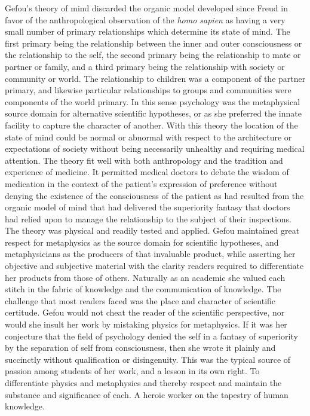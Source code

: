 Gefou's theory of mind discarded the organic model developed since
Freud in favor of the anthropological observation of the {\it homo
sapien} as having a very small number of primary relationships which
determine its state of mind.  The first primary being the relationship
between the inner and outer consciousness or the relationship to the
self, the second primary being the relationship to mate or partner or
family, and a third primary being the relationship with society or
community or world.  The relationship to children was a component of
the partner primary, and likewise particular relationships to groups
and communities were components of the world primary.  In this sense
psychology was the metaphysical source domain for alternative
scientific hypotheses, or as she preferred the innate facility to
capture the character of another.  With this theory the location of
the state of mind could be normal or abnormal with respect to the
architecture or expectations of society without being necessarily
unhealthy and requiring medical attention.  The theory fit well with
both anthropology and the tradition and experience of medicine.  It
permitted medical doctors to debate the wisdom of medication in the
context of the patient's expression of preference without denying the
existence of the consciousness of the patient as had resulted from the
organic model of mind that had delivered the superiority fantasy that
doctors had relied upon to manage the relationship to the subject of
their inspections.  The theory was physical and readily tested and
applied.  Gefou maintained great respect for metaphysics as the source
domain for scientific hypotheses, and metaphysicians as the producers
of that invaluable product, while asserting her objective and
subjective material with the clarity readers required to differentiate
her products from those of others.  Naturally as an academic she
valued each stitch in the fabric of knowledge and the communication of
knowledge.  The challenge that most readers faced was the place and
character of scientific certitude.  Gefou would not cheat the reader
of the scientific perspective, nor would she insult her work by
mistaking physics for metaphysics.  If it was her conjecture that the
field of psychology denied the self in a fantasy of superiority by the
separation of self from consciousness, then she wrote it plainly and
succinctly without qualification or disingenuity.  This was the
typical source of passion among students of her work, and a lesson in
its own right.  To differentiate physics and metaphysics and thereby
respect and maintain the substance and significance of each.  A heroic
worker on the tapestry of human knowledge.



\bye
